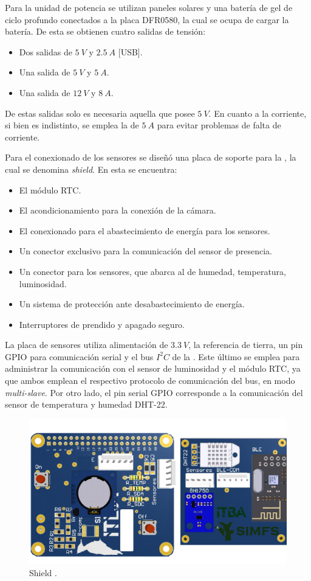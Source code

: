 
Para la unidad de potencia se utilizan paneles solares y una batería de gel de ciclo profundo conectados a la placa DFR0580, la cual se ocupa de cargar la batería. De esta se obtienen cuatro salidas de tensión:
\begin{itemize}
	\item Dos salidas de $5 \ V$ y $2.5 \ A$ [USB].
	\item Una salida de $5 \ V$ y $5 \ A$.
	\item Una salida de $12 \ V$ y $8 \ A$.
\end{itemize}
De estas salidas solo es necesaria aquella que posee $5 \ V$. En cuanto a la corriente, si bien es indistinto, se emplea la de $5 \ A$ para evitar problemas de falta de corriente.

Para el conexionado de los sensores se diseñó una placa de soporte para la \rspi, la cual se denomina \textit{shield}. En esta se encuentra:
\begin{itemize}
	\item El módulo RTC.
	\item El acondicionamiento para la conexión de la cámara.
	\item El conexionado para el abastecimiento de energía para los sensores.
	\item Un conector exclusivo para la comunicación del sensor de presencia.
	\item Un conector para los sensores, que abarca al de humedad, temperatura, luminosidad.
	\item Un sistema de protección ante desabastecimiento de energía.
	\item Interruptores de prendido y apagado seguro.
\end{itemize}

La placa de sensores utiliza alimentación de $3.3 \ V$, la referencia de tierra, un pin GPIO para comunicación serial y el bus $I^2C$ de la \rpi. Este último se emplea para administrar la comunicación con el sensor de luminosidad y el módulo RTC, ya que ambos emplean el respectivo protocolo de comunicación del bus, en modo \textit{multi-slave}. Por otro lado, el pin serial GPIO corresponde a la comunicación del sensor de temperatura y humedad DHT-22. 
\begin{figure}[H]
	\centering
	\includegraphics[width=0.9\linewidth,page=1]{ImagenesIngenieria de Detalle/RPI}		
	\caption{Shield \rspi.}
	\label{fig:conexionado_Rpi}
\end{figure}

